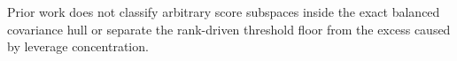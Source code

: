 Prior work does not classify arbitrary score subspaces inside the exact balanced covariance hull or separate the rank-driven threshold floor from the excess caused by leverage concentration.